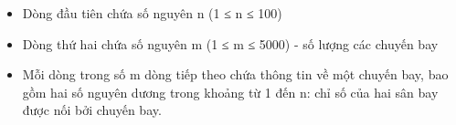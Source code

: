 \begin{itemize}
	\item     Dòng đầu tiên chứa số nguyên n (1 ≤ n ≤ 100)   
	\item     Dòng thứ hai chứa số nguyên m (1 ≤ m ≤ 5000) - số lượng các chuyến bay   
	\item     Mỗi dòng trong số m dòng tiếp theo chứa thông tin về một chuyến bay, bao gồm hai số nguyên dương trong khoảng từ 1 đến n: chỉ số của hai sân bay được nối bởi chuyến bay.   
\end{itemize}